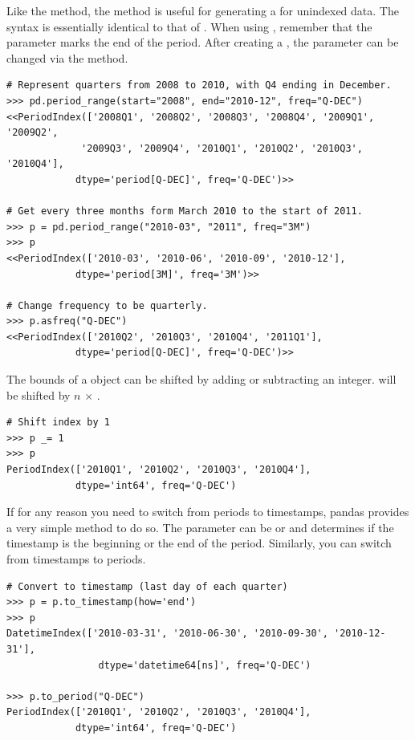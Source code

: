 Like the  method, the  method is useful for generating a  for unindexed data.
The syntax is essentially identical to that of .
When using , remember that the  parameter marks the end of the period.
After creating a , the  parameter can be changed via the  method.

\begin{lstlisting}
# Represent quarters from 2008 to 2010, with Q4 ending in December.
>>> pd.period_range(start="2008", end="2010-12", freq="Q-DEC")
<<PeriodIndex(['2008Q1', '2008Q2', '2008Q3', '2008Q4', '2009Q1', '2009Q2',
             '2009Q3', '2009Q4', '2010Q1', '2010Q2', '2010Q3', '2010Q4'],
            dtype='period[Q-DEC]', freq='Q-DEC')>>

# Get every three months form March 2010 to the start of 2011.
>>> p = pd.period_range("2010-03", "2011", freq="3M")
>>> p
<<PeriodIndex(['2010-03', '2010-06', '2010-09', '2010-12'],
            dtype='period[3M]', freq='3M')>>

# Change frequency to be quarterly.
>>> p.asfreq("Q-DEC")
<<PeriodIndex(['2010Q2', '2010Q3', '2010Q4', '2011Q1'],
            dtype='period[Q-DEC]', freq='Q-DEC')>>
\end{lstlisting}

The bounds of a  object can be shifted by adding or subtracting an integer.
  will be shifted by $n$ $\times$ .

\begin{lstlisting}
# Shift index by 1
>>> p _= 1
>>> p
PeriodIndex(['2010Q1', '2010Q2', '2010Q3', '2010Q4'],
            dtype='int64', freq='Q-DEC')
\end{lstlisting}

If for any reason you need to switch from periods to timestamps, pandas provides a very simple method to do so.
The  parameter can be  or  and determines if the timestamp is the beginning or the end of the period.
Similarly, you can switch from timestamps to periods.

\begin{lstlisting}
# Convert to timestamp (last day of each quarter)
>>> p = p.to_timestamp(how='end')
>>> p
DatetimeIndex(['2010-03-31', '2010-06-30', '2010-09-30', '2010-12-31'],
                dtype='datetime64[ns]', freq='Q-DEC')

>>> p.to_period("Q-DEC")
PeriodIndex(['2010Q1', '2010Q2', '2010Q3', '2010Q4'],
            dtype='int64', freq='Q-DEC')

\end{lstlisting}

